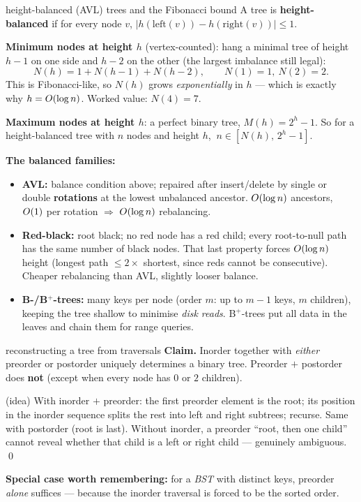 \begin{facts}{height-balanced (AVL) trees and the Fibonacci bound}
A tree is \textbf{height-balanced} if for every node $v$,
$\bigl|h(\text{left}(v))-h(\text{right}(v))\bigr|\le1$.

\textbf{Minimum nodes at height $h$} (vertex-counted): hang a minimal tree of height $h-1$ on one
side and $h-2$ on the other (the largest imbalance still legal):
\[
  N(h)=1+N(h-1)+N(h-2),\qquad N(1)=1,\ N(2)=2 .
\]
This is Fibonacci-like, so $N(h)$ grows \emph{exponentially} in $h$ --- which is exactly why
$h=O(\log n)$. Worked value: $N(4)=7$.

\textbf{Maximum nodes at height $h$}: a perfect binary tree, $M(h)=2^h-1$. So for a
height-balanced tree with $n$ nodes and height $h$, $\ n\in[N(h),\,2^h-1]$.

\textbf{The balanced families:}
\begin{itemize}
  \item \textbf{AVL:} balance condition above; repaired after insert/delete by single or double
        \textbf{rotations} at the lowest unbalanced ancestor. $O(\log n)$ ancestors, $O(1)$ per
        rotation $\Rightarrow$ $O(\log n)$ rebalancing.
  \item \textbf{Red-black:} root black; no red node has a red child; every root-to-null path has
        the same number of black nodes. That last property forces $O(\log n)$ height (longest
        path $\le2\times$ shortest, since reds cannot be consecutive). Cheaper rebalancing than
        AVL, slightly looser balance.
  \item \textbf{B-/B$^+$-trees:} many keys per node (order $m$: up to $m-1$ keys, $m$ children),
        keeping the tree shallow to minimise \emph{disk reads}. B$^+$-trees put all data in the
        leaves and chain them for range queries.
\end{itemize}
\end{facts}

\begin{facts}{reconstructing a tree from traversals}
\textbf{Claim.} Inorder together with \emph{either} preorder or postorder uniquely determines a
binary tree. Preorder $+$ postorder does \textbf{not} (except when every node has $0$ or $2$
children).

\prf(idea) With inorder $+$ preorder: the first preorder element is the root; its position in the
inorder sequence splits the rest into left and right subtrees; recurse. Same with postorder (root
is last). Without inorder, a preorder ``root, then one child'' cannot reveal whether that child is
a left or right child --- genuinely ambiguous. \qed

\textbf{Special case worth remembering:} for a \emph{BST} with distinct keys, preorder \emph{alone}
suffices --- because the inorder traversal is forced to be the sorted order.
\end{facts}

